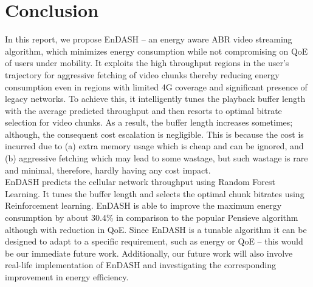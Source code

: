 \section{\textbf{Conclusion}}\label{section:conclusion}
\acresetall
In this report, we propose EnDASH -- an energy aware ABR video streaming algorithm, which minimizes energy consumption while not compromising on QoE of users under mobility. It exploits the high throughput regions in the user's trajectory for aggressive fetching of video chunks thereby reducing energy consumption even in regions with limited 4G coverage and significant presence of legacy networks.  To achieve this, it intelligently tunes the playback buffer length with the average predicted throughput and then resorts to optimal bitrate selection for video chunks. As a result, the buffer length increases sometimes; although, the consequent cost  escalation is negligible. This is because the cost is incurred due to  (a) extra memory usage which is cheap  and can be ignored, and (b) aggressive fetching which may lead to some wastage, but such wastage is rare and minimal, therefore, hardly having any cost impact.\\  %
\indent EnDASH predicts the cellular network throughput using Random Forest Learning. It tunes the buffer length and selects the optimal chunk bitrates using Reinforcement learning. EnDASH is able to improve the maximum energy consumption by about 30.4\% in comparison to the popular Pensieve algorithm although with reduction in QoE. Since EnDASH is a tunable algorithm it can be designed to adapt to a specific  requirement, such as energy or QoE -- this would be our immediate future work.  Additionally, our future work will also involve real-life implementation of EnDASH and investigating the corresponding improvement in energy efficiency.
